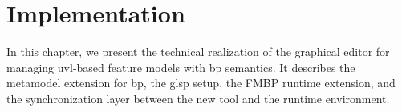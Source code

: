 \chapter{Implementation}
\label{chapter:implementation}

In this chapter, we present the technical realization of the graphical editor for managing \gls{uvl}-based feature models with \gls{bp} semantics.
It describes the metamodel extension for \gls{bp}, the \gls{glsp} setup, the FMBP runtime extension, and the synchronization layer between the new tool and the runtime environment.









